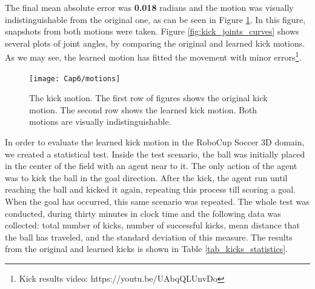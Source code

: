 The final mean absolute error was \textbf{0.018} radians and the motion was visually indistinguishable from the original one, as can be seen in Figure \ref{fig:motions}. In this figure, snapshots from both motions were taken. Figure \ref{fig:kick_joints_curves} shows several plots of joint angles, by comparing the original and learned kick motions. As we may see, the learned motion has fitted the movement with minor errors\footnote{\label{footnote_walk} Kick results video: https://youtu.be/UAbqQLUnvDo}.

\begin{figure}[!htbp]
	\centering
	\texttt{[image: Cap6/motions]}
	\caption{The kick motion. The first row of figures shows the original kick motion. The second row shows the learned kick motion. Both motions are visually indistinguishable.}
	\label{fig:motions}
\end{figure} 

In order to evaluate the learned kick motion in the RoboCup Soccer 3D domain, we created a statistical test. Inside the test scenario, the ball was initially placed in the center of the field with an agent near to it. The only action of the agent was to kick the ball in the goal direction. After the kick, the agent run until reaching the ball and kicked it again, repeating this process till scoring a goal. When the goal has occurred, this same scenario was repeated. The whole test was conducted, during thirty minutes in clock time and the following data was collected: total number of kicks, number of successful kicks, mean distance that the ball has traveled, and the standard deviation of this measure. The results from the original and learned kicks is shown in Table \ref{tab_kicks_statistics}.


